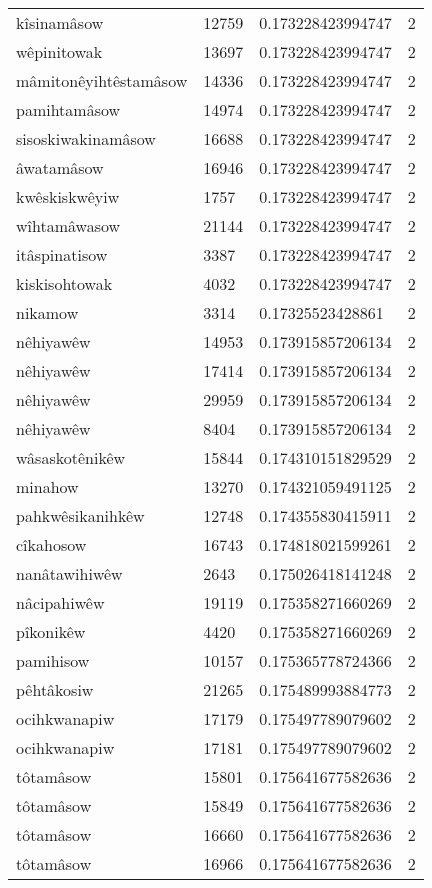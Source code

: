 \begin{longtable}{llll}
kîsinamâsow & 12759 & 0.173228423994747 & 2 \\
wêpinitowak & 13697 & 0.173228423994747 & 2 \\
mâmitonêyihtêstamâsow & 14336 & 0.173228423994747 & 2 \\
pamihtamâsow & 14974 & 0.173228423994747 & 2 \\
sisoskiwakinamâsow & 16688 & 0.173228423994747 & 2 \\
âwatamâsow & 16946 & 0.173228423994747 & 2 \\
kwêskiskwêyiw & 1757 & 0.173228423994747 & 2 \\
wîhtamâwasow & 21144 & 0.173228423994747 & 2 \\
itâspinatisow & 3387 & 0.173228423994747 & 2 \\
kiskisohtowak & 4032 & 0.173228423994747 & 2 \\
nikamow & 3314 & 0.17325523428861 & 2 \\
nêhiyawêw & 14953 & 0.173915857206134 & 2 \\
nêhiyawêw & 17414 & 0.173915857206134 & 2 \\
nêhiyawêw & 29959 & 0.173915857206134 & 2 \\
nêhiyawêw & 8404 & 0.173915857206134 & 2 \\
wâsaskotênikêw & 15844 & 0.174310151829529 & 2 \\
minahow & 13270 & 0.174321059491125 & 2 \\
pahkwêsikanihkêw & 12748 & 0.174355830415911 & 2 \\
cîkahosow & 16743 & 0.174818021599261 & 2 \\
nanâtawihiwêw & 2643 & 0.175026418141248 & 2 \\
nâcipahiwêw & 19119 & 0.175358271660269 & 2 \\
pîkonikêw & 4420 & 0.175358271660269 & 2 \\
pamihisow & 10157 & 0.175365778724366 & 2 \\
pêhtâkosiw & 21265 & 0.175489993884773 & 2 \\
ocihkwanapiw & 17179 & 0.175497789079602 & 2 \\
ocihkwanapiw & 17181 & 0.175497789079602 & 2 \\
tôtamâsow & 15801 & 0.175641677582636 & 2 \\
tôtamâsow & 15849 & 0.175641677582636 & 2 \\
tôtamâsow & 16660 & 0.175641677582636 & 2 \\
tôtamâsow & 16966 & 0.175641677582636 & 2 \\

\end{longtable}
